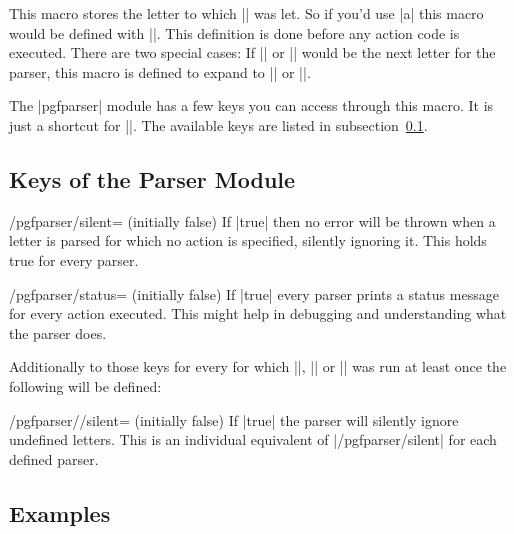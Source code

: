 \begin{command}{\pgfparserletter}%
    This macro stores the letter to which |\pgfparsertoken| was let. So if
    you'd use |a| this macro would be defined with
    |\def\pgfparserletter{a}|. This definition is done before any action code
    is executed. There are two special cases: If |{| or |}| would be the next
    letter for the parser, this macro is defined to expand to |\bgroup| or
    |\egroup|.
\end{command}%

\begin{command}{\pgfparserset{}}%
    The |pgfparser| module has a few keys you can access through this macro. It
    is just a shortcut for ||. The available keys are
    listed in subsection~\ref{sec:parser:keys}.
\end{command}%


\subsection{Keys of the Parser Module}\label{sec:parser:keys}%

\begin{key}{/pgfparser/silent= (initially false)}%
    If |true| then no error will be thrown when a letter is parsed for which no
    action is specified, silently ignoring it. This holds true for every parser.
\end{key}%

\begin{key}{/pgfparser/status= (initially false)}%
    If |true| every parser prints a status message for every action executed.
    This might help in debugging and understanding what the parser does.
\end{key}%

Additionally to those keys for every  for which
|\pgfparserdef|, |\pgfparserdefunknown| or |\pgfparserlet| was run at least
once the following will be defined:

\begin{key}{/pgfparser//silent= (initially false)}%
    If |true| the parser  will silently ignore undefined
    letters. This is an individual equivalent of |/pgfparser/silent| for each
    defined parser.
\end{key}%


\subsection{Examples}%

